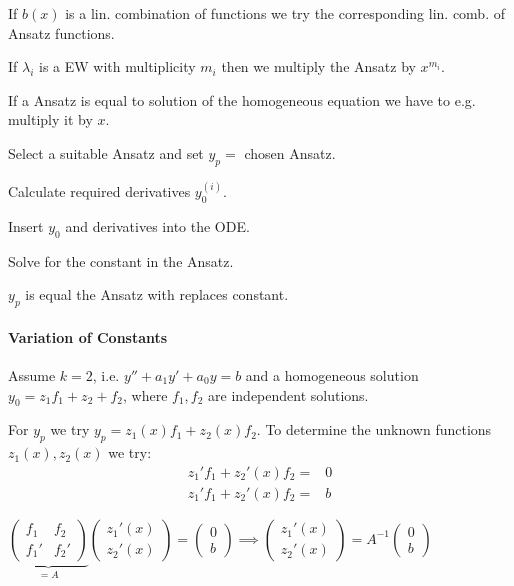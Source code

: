 \begin{compactitem}
    \item If $b(x)$ is a lin. combination of functions we try the corresponding lin. comb. of Ansatz functions.
    \item If $\lambda_i$ is a EW with multiplicity $m_i$ then we multiply the Ansatz by $x^{m_i}$.
    \item If a Ansatz is equal to solution of the homogeneous equation we have to e.g. multiply it by $x$.
\end{compactitem}

\begin{compactenum}
    \item Select a suitable Ansatz and set $y_p =$ chosen Ansatz.
    \item Calculate required derivatives $y_0^{(i)}$.
    \item Insert $y_0$ and derivatives into the ODE.
    \item Solve for the constant in the Ansatz.
    \item $y_p$ is equal the Ansatz with replaces constant.
\end{compactenum}

\paragraph{Variation of Constants}
Assume $k = 2$, i.e. $y'' + a_1y' + a_0y = b$ and a homogeneous solution $y_0 = z_1 f_1 + z_2 + f_2$, where $f_1, f_2$ are independent solutions.

For $y_p$ we try $y_p = z_1(x) f_1 + z_2(x) f_2$. To determine the unknown functions $z_1(x), z_2(x)$ we try:
\begin{align*}
    z_1'f_1 + z_2'(x)f_2 =& 0\\ 
    z_1'f_1 + z_2'(x)f_2 =& b
\end{align*}

$
\underbrace{
\begin{pmatrix}
    f_1 & f_2\\
    f_1' & f_2'
\end{pmatrix}
}_{=A}
\begin{pmatrix}
    z_1'(x)\\
    z_2'(x)
\end{pmatrix}=
\begin{pmatrix}
    0\\
    b
\end{pmatrix}\implies
\begin{pmatrix}
    z_1'(x)\\
    z_2'(x)
\end{pmatrix}= 
A^{-1}
\begin{pmatrix}
    0\\
    b
\end{pmatrix}
$

